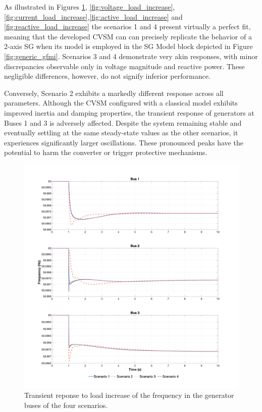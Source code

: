 As illustrated in Figures \ref{fig:omega_load_increase},
\ref{fig:voltage_load_increase},\ref{fig:current_load_increase},\ref{fig:active_load_increase}
and \ref{fig:reactive_load_increase} the scenarios 1 and 4 present virtually a
perfect fit, meaning that the developed CVSM can can precisely replicate the
behavior of a 2-axis SG when its model is employed in the SG Model block
depicted in Figure \ref{fig:generic_gfmi}. Scenarios 3 and 4 demonstrate very
akin responses, with minor discrepancies observable only in voltage magnitude
and reactive power. These negligible differences, however, do not signify
inferior performance. 

Conversely, Scenario 2 exhibits a markedly different response across all
parameters. Although the CVSM configured with a classical model exhibits
improved inertia and damping properties, the transient response of generators at
Buses 1 and 3 is adversely affected. Despite the system remaining stable and
eventually settling at the same steady-state values as the other scenarios, it
experiences significantly larger oscillations. These pronounced peaks have the
potential to harm the converter or trigger protective mechanisms.

\newpage
\begin{figure}[ht!]
    \centering
    \includegraphics[width = \linewidth]{images/omega_load_increase.png}
    \caption{Transient reponse to load increase of the frequency in the generator buses of the four scenarios.}
    \label{fig:omega_load_increase}
\end{figure}

